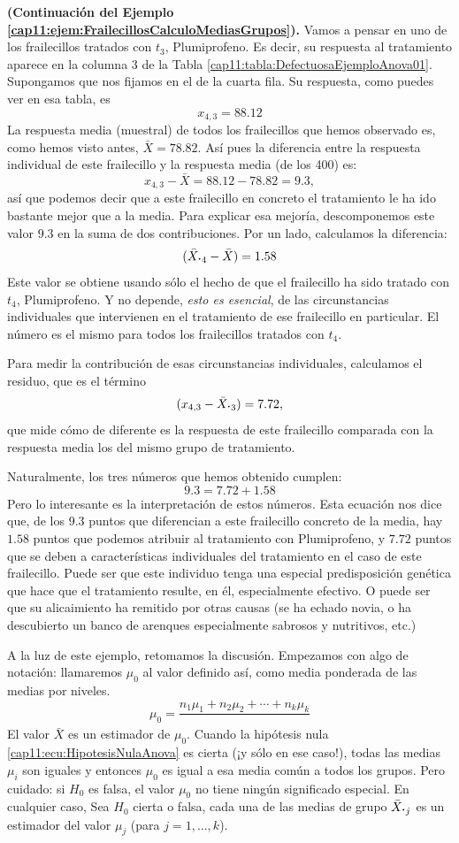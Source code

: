 \begin{ejemplo}{\bf (Continuación del Ejemplo \ref{cap11:ejem:FrailecillosCalculoMediasGrupos}).}
\label{cap11:ejem:FrailecillosCalculoMediasGrupos-a}
Vamos a pensar en uno de los frailecillos tratados con $t_3$, Plumiprofeno. Es decir, su respuesta al tratamiento aparece en la columna $3$ de la Tabla \ref{cap11:tabla:DefectuosaEjemploAnova01}. Supongamos que nos fijamos en el de la cuarta fila. Su respuesta, como puedes ver en esa tabla, es
\[x_{4,3}=88.12\]
La respuesta media (muestral) de todos los frailecillos que hemos observado es, como hemos visto antes, $\bar{X}=78.82$. Así pues la diferencia entre la respuesta individual de este frailecillo y la respuesta media (de los 400) es:
\[x_{4,3}  - \bar X = 88.12 - 78.82 = 9.3,\]
así que podemos decir que a este frailecillo en concreto el tratamiento le ha ido bastante mejor que a la media. Para explicar esa mejoría, descomponemos este valor $9.3$ en la suma de dos contribuciones. Por un lado, calculamos la diferencia:
\[(\bar X_{\mbox{\bf\large$\cdot$}4}-\bar X)=  1.58\]
Este valor se obtiene usando sólo el hecho de que el frailecillo ha sido tratado con $t_4$,  Plumiprofeno. Y no depende, {\em esto es esencial}, de las circunstancias individuales que intervienen en el tratamiento de ese frailecillo en particular. El número es el mismo para todos los frailecillos tratados con $t_4$.

Para medir la contribución de esas circunstancias individuales, calculamos el residuo, que es el término
\[(x_{4,3}-\bar X_{\mbox{\bf\large $\cdot$}3})= 7.72,\]
que mide cómo de diferente es la respuesta de este frailecillo comparada con la respuesta media los del mismo grupo de tratamiento.

Naturalmente, los tres números que hemos obtenido cumplen:
\[9.3 = 7.72 + 1.58\]
Pero lo interesante es la interpretación de estos números. Esta ecuación nos dice que, de los 9.3 puntos que diferencian a este frailecillo concreto de la media, hay $1.58$ puntos que podemos atribuir al tratamiento con Plumiprofeno, y $7.72$ puntos que se deben a características individuales del tratamiento en el caso de este frailecillo. Puede ser que este individuo tenga una especial predisposición genética que hace que el tratamiento resulte, en él, especialmente efectivo. O puede ser que su alicaimiento ha remitido por otras causas (se ha echado novia, o ha descubierto un banco de arenques especialmente sabrosos y nutritivos, etc.)
\end{ejemplo}

A la luz de este ejemplo, retomamos la discusión. Empezamos con algo de notación: llamaremos $\mu_0$ al valor definido así, como media ponderada de las medias por niveles.
$$
\mu_ 0 = \dfrac{n_1\mu_1 + n_2\mu_2 +\cdots + n_k\mu_k}{}
$$
El valor $\bar X$ es un estimador de $\mu_0$. Cuando la hipótesis nula \ref{cap11:ecu:HipotesisNulaAnova} es cierta (¡y sólo en ese caso!), todas las medias $\mu_i$ son iguales y entonces $\mu_0$ es igual a esa media común a todos los grupos. Pero cuidado: si $H_0$ es falsa, el valor $\mu_0$ no tiene ningún significado especial. En cualquier caso, Sea $H_0$ cierta o falsa, cada una de las medias de grupo $\bar X_{\mbox{\bf\large $\cdot$}j}$ es un estimador del valor $\mu_j$ (para $j=1,\ldots,k$). 

